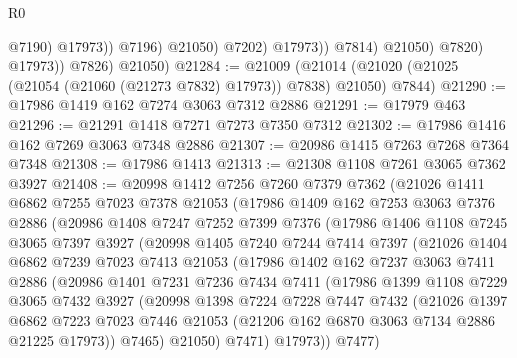 \begin{lexlean}{R0}
\begin{coremodule}
                                  @7190)
                                @17973))
                            @7196)
                          @21050)
                        @7202)
                      @17973))
                  @7814)
                @21050)
              @7820)
            @17973))
        @7826)
      @21050)
@21284 := @21009
    (@21014 (@21020 (@21025 (@21054 (@21060 (@21273 @7832) @17973)) @7838) @21050) @7844)
@21290 := @17986 @1419 @162 @7274 @3063 @7312 @2886
@21291 := @17979 @463
@21296 := @21291 @1418 @7271 @7273 @7350 @7312
@21302 := @17986 @1416 @162 @7269 @3063 @7348 @2886
@21307 := @20986 @1415 @7263 @7268 @7364 @7348
@21308 := @17986 @1413
@21313 := @21308 @1108 @7261 @3065 @7362 @3927
@21408 := @20998
    @1412
    @7256
    @7260
    @7379
    @7362
    (@21026
      @1411
      @6862
      @7255
      @7023
      @7378
      @21053
      (@17986
        @1409
        @162
        @7253
        @3063
        @7376
        @2886
        (@20986
          @1408
          @7247
          @7252
          @7399
          @7376
          (@17986
            @1406
            @1108
            @7245
            @3065
            @7397
            @3927
            (@20998
              @1405
              @7240
              @7244
              @7414
              @7397
              (@21026
                @1404
                @6862
                @7239
                @7023
                @7413
                @21053
                (@17986
                  @1402
                  @162
                  @7237
                  @3063
                  @7411
                  @2886
                  (@20986
                    @1401
                    @7231
                    @7236
                    @7434
                    @7411
                    (@17986
                      @1399
                      @1108
                      @7229
                      @3065
                      @7432
                      @3927
                      (@20998
                        @1398
                        @7224
                        @7228
                        @7447
                        @7432
                        (@21026
                          @1397
                          @6862
                          @7223
                          @7023
                          @7446
                          @21053
                          (@21206 @162 @6870 @3063 @7134 @2886 @21225 @17973))
                        @7465)
                      @21050)
                    @7471)
                  @17973))
              @7477)

\end{coremodule}
\end{lexlean}
